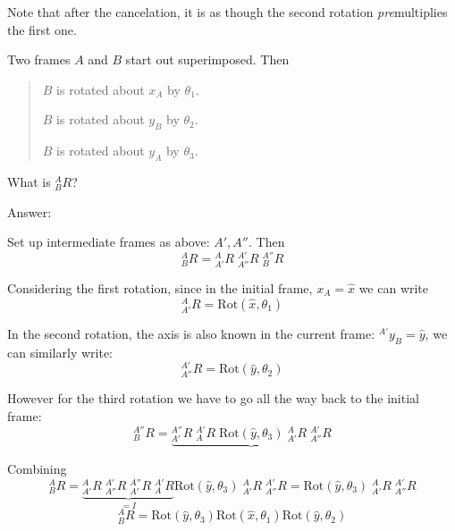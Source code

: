 \begin{Example}
Note that after the cancelation, it is as though the second rotation {\it pre}multiplies the first one.

\end{Example}


\begin{Example}\label{RotExamp3Mixed}
Two frames $A$ and $B$ start out superimposed.  Then

\begin{quotation}

$B$ is rotated about $x_A$ by $\theta_1$.

$B$ is rotated about $y_B$ by $\theta_2$.

$B$ is rotated about $y_A$ by $\theta_3$.

\end{quotation}

What is $^A_BR$?

\vspace{0.2in}

Answer:

Set up intermediate frames as above:  $A', A''$.  Then
\[
^A_BR = {}^A_{A'}R \; ^{A'}_{A''}R \; ^{A''}_BR
\]

Considering the first rotation, since in the initial frame, $x_A = \hat{x}$ we can write
\[
^A_{A'}R = \mathrm{Rot}(\hat{x},\theta_1)
\]

In the second rotation, the axis is also known in the current frame: $^{A'}y_B=\hat{y}$, we can similarly write:
\[
^{A'}_{A''}R = \mathrm{Rot}(\hat{y},\theta_2)
\]

However for the third rotation we have to go all the way back to the initial frame:
\[
^{A''}_{B}R = \underbrace{
               ^{A''}_{A'}R \; ^{A'}_{A}R \; \mathrm{Rot}(\hat{y},\theta_3) \;  ^{A}_{A'}R \;^{A'}_{A''}R
               }
\]

Combining
\[
^A_BR = \underbrace{
     {}^A_{A'}R \; ^{A'}_{A''}R \;  ^{A''}_{A'}R \; ^{A'}_{A}R
     }_{=I}
\mathrm{Rot}(\hat{y},\theta_3) \;  ^{A}_{A'}R \;^{A'}_{A''}R
= \mathrm{Rot}(\hat{y},\theta_3) \;  ^{A}_{A'}R \;^{A'}_{A''}R
\]
\[
^A_BR = \mathrm{Rot}(\hat{y},\theta_3) \mathrm{Rot}(\hat{x},\theta_1) \mathrm{Rot}(\hat{y},\theta_2)
\]

\end{Example}


